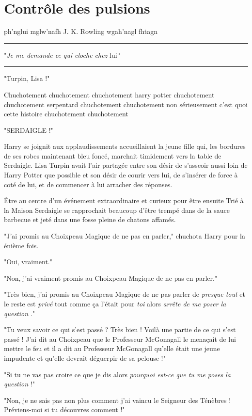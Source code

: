 
\chapter{Contrôle des pulsions}

ph'nglui mglw'nafh J. K. Rowling wgah'nagl fhtagn
\par\noindent\rule{\textwidth}{0.4pt}
"\emph{Je me demande ce qui cloche chez } lui\emph{"} 
\par\noindent\rule{\textwidth}{0.4pt}
"Turpin, Lisa !"

Chuchotement chuchotement chuchotement harry potter chuchotement chuchotement serpentard chuchotement chuchotement non sérieusement c'est quoi cette histoire chuchotement chuchotement

"SERDAIGLE !"

Harry se joignit aux applaudissements accueillaient la jeune fille qui, les bordures de ses robes maintenant bleu foncé, marchait timidement vers la table de Serdaigle. Lisa Turpin avait l'air partagée entre son désir de s'asseoir aussi loin de Harry Potter que possible et son désir de courir vers lui, de s'insérer de force à coté de lui, et de commencer à lui arracher des réponses.

Être au centre d'un événement extraordinaire et curieux pour être ensuite Trié à la Maison Serdaigle se rapprochait beaucoup d'être trempé dans de la sauce barbecue et jeté dans une fosse pleine de chatons affamés.

"J'ai promis au Choixpeau Magique de ne pas en parler," chuchota Harry pour la énième fois.

"Oui, vraiment."

"Non, j'ai vraiment promis au Choixpeau Magique de ne pas en parler."

"Très bien, j'ai promis au Choixpeau Magique de ne pas parler de \emph{presque tout}  et le reste est \emph{privé}  tout comme ça l'était pour \emph{toi}  alors \emph{arrête de me poser la question} ."

"Tu veux savoir ce qui s'est passé ? Très bien ! Voilà une partie de ce qui s'est passé ! J'ai dit au Choixpeau que le Professeur McGonagall le menaçait de lui mettre le feu et il a dit au Professeur McGonagall qu'elle était une jeune impudente et qu'elle devrait déguerpir de sa pelouse !"

"Si tu ne vas pas croire ce que je dis alors \emph{pourquoi est-ce que tu me poses la question}  !"

"Non, je ne sais pas non plus comment j'ai vaincu le Seigneur des Ténèbres ! Préviens-moi si tu découvres comment !"


